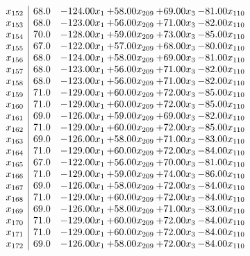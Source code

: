 \documentclass[8pt]{article}
\begin{document}
\[\begin{array}{c| c c@{\hskip 2pt} c@{\hskip 2pt} c@{\hskip 2pt} c@{\hskip 2pt} }
 x_{152}   &  68.0 & -124.00 x_{1} & + 58.00 x_{209} & + 69.00 x_{3} & -81.00 x_{110}\\
 x_{153}   &  68.0 & -123.00 x_{1} & + 56.00 x_{209} & + 71.00 x_{3} & -82.00 x_{110}\\
 x_{154}   &  70.0 & -128.00 x_{1} & + 59.00 x_{209} & + 73.00 x_{3} & -85.00 x_{110}\\
 x_{155}   &  67.0 & -122.00 x_{1} & + 57.00 x_{209} & + 68.00 x_{3} & -80.00 x_{110}\\
 x_{156}   &  68.0 & -124.00 x_{1} & + 58.00 x_{209} & + 69.00 x_{3} & -81.00 x_{110}\\
 x_{157}   &  68.0 & -123.00 x_{1} & + 56.00 x_{209} & + 71.00 x_{3} & -82.00 x_{110}\\
 x_{158}   &  68.0 & -123.00 x_{1} & + 56.00 x_{209} & + 71.00 x_{3} & -82.00 x_{110}\\
 x_{159}   &  71.0 & -129.00 x_{1} & + 60.00 x_{209} & + 72.00 x_{3} & -85.00 x_{110}\\
 x_{160}   &  71.0 & -129.00 x_{1} & + 60.00 x_{209} & + 72.00 x_{3} & -85.00 x_{110}\\
 x_{161}   &  69.0 & -126.00 x_{1} & + 59.00 x_{209} & + 69.00 x_{3} & -82.00 x_{110}\\
 x_{162}   &  71.0 & -129.00 x_{1} & + 60.00 x_{209} & + 72.00 x_{3} & -85.00 x_{110}\\
 x_{163}   &  69.0 & -126.00 x_{1} & + 58.00 x_{209} & + 71.00 x_{3} & -83.00 x_{110}\\
 x_{164}   &  71.0 & -129.00 x_{1} & + 60.00 x_{209} & + 72.00 x_{3} & -84.00 x_{110}\\
 x_{165}   &  67.0 & -122.00 x_{1} & + 56.00 x_{209} & + 70.00 x_{3} & -81.00 x_{110}\\
 x_{166}   &  71.0 & -129.00 x_{1} & + 59.00 x_{209} & + 74.00 x_{3} & -86.00 x_{110}\\
 x_{167}   &  69.0 & -126.00 x_{1} & + 58.00 x_{209} & + 72.00 x_{3} & -84.00 x_{110}\\
 x_{168}   &  71.0 & -129.00 x_{1} & + 60.00 x_{209} & + 72.00 x_{3} & -84.00 x_{110}\\
 x_{169}   &  69.0 & -126.00 x_{1} & + 58.00 x_{209} & + 71.00 x_{3} & -83.00 x_{110}\\
 x_{170}   &  71.0 & -129.00 x_{1} & + 60.00 x_{209} & + 72.00 x_{3} & -84.00 x_{110}\\
 x_{171}   &  71.0 & -129.00 x_{1} & + 60.00 x_{209} & + 72.00 x_{3} & -84.00 x_{110}\\
 x_{172}   &  69.0 & -126.00 x_{1} & + 58.00 x_{209} & + 72.00 x_{3} & -84.00 x_{110}\\

\end{array}\]
\end{document}
